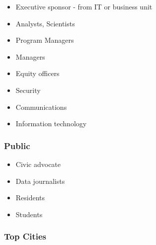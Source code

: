 \documentclass[
  openany]{book}
\providecommand{\tightlist}{%
  \setlength{\itemsep}{0pt}\setlength{\parskip}{0pt}}
\begin{document}
\begin{itemize}
\tightlist
\item
  Executive sponsor - from IT or business unit
\item
  Analysts, Scientists
\item
  Program Managers
\item
  Managers
\item
  Equity officers
\item
  Security
\item
  Communications
\item
  Information technology
\end{itemize}

\hypertarget{public}{%
\subsubsection{Public}\label{public}}

\begin{itemize}
\tightlist
\item
  Civic advocate
\item
  Data journalists
\item
  Residents
\item
  Students
\end{itemize}

\hypertarget{top-cities}{%
\subsubsection{Top Cities}\label{top-cities}}
\end{document}
